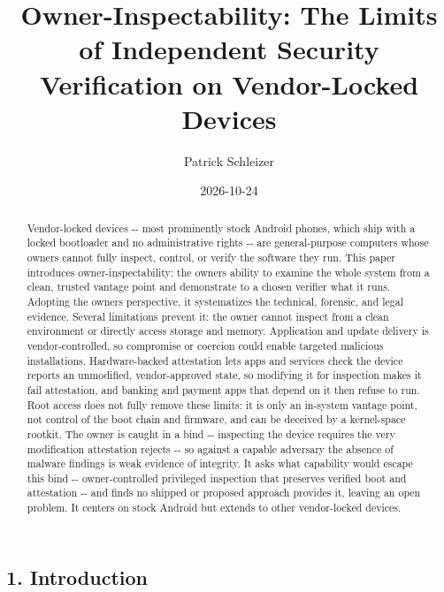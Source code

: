\documentclass[
]{article}
\title{Owner-Inspectability: The Limits of Independent Security
Verification on Vendor-Locked Devices}
\author{Patrick Schleizer}
\date{2026-10-24}
\begin{document}
\maketitle
\begin{abstract}
Vendor-locked devices -\/- most prominently stock Android phones, which
ship with a locked bootloader and no administrative rights -\/- are
general-purpose computers whose owners cannot fully inspect, control, or
verify the software they run. This paper introduces
owner-inspectability: the owner\textquotesingle s ability to examine the
whole system from a clean, trusted vantage point and demonstrate to a
chosen verifier what it runs. Adopting the owner\textquotesingle s
perspective, it systematizes the technical, forensic, and legal
evidence. Several limitations prevent it: the owner cannot inspect from
a clean environment or directly access storage and memory. Application
and update delivery is vendor-controlled, so compromise or coercion
could enable targeted malicious installations. Hardware-backed
attestation lets apps and services check the device reports an
unmodified, vendor-approved state, so modifying it for inspection makes
it fail attestation, and banking and payment apps that depend on it then
refuse to run. Root access does not fully remove these limits: it is
only an in-system vantage point, not control of the boot chain and
firmware, and can be deceived by a kernel-space rootkit. The owner is
caught in a bind -\/- inspecting the device requires the very
modification attestation rejects -\/- so against a capable adversary the
absence of malware findings is weak evidence of integrity. It asks what
capability would escape this bind -\/- owner-controlled privileged
inspection that preserves verified boot and attestation -\/- and finds
no shipped or proposed approach provides it, leaving an open problem. It
centers on stock Android but extends to other vendor-locked devices.
\end{abstract}

\subsection{1. Introduction}\label{introduction}
\end{document}
